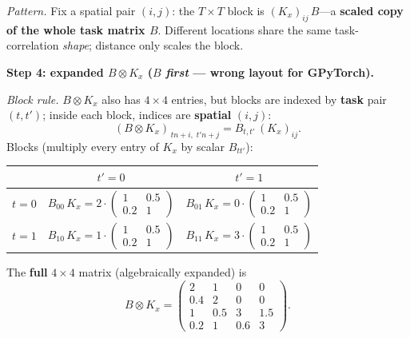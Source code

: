 \documentclass[11pt]{article}
\theoremstyle{plain}
\begin{document}
\smallskip\noindent
\textit{Pattern.} Fix a spatial pair $(i,j)$: the $T \times T$ block is $(K_x)_{ij}\,B$---a \textbf{scaled copy of the whole task matrix $B$}.
Different locations share the same task-correlation \emph{shape}; distance only scales the block.

\medskip
\textbf{Step 4: expanded $B \otimes K_x$ ($B$ \emph{first} --- wrong layout for GPyTorch).}

\smallskip\noindent
\textit{Block rule.} $B \otimes K_x$ also has $4 \times 4$ entries, but blocks are indexed by
\textbf{task} pair $(t,t')$; inside each block, indices are \textbf{spatial} $(i,j)$:
\begin{equation*}
  (B \otimes K_x)_{\,t n + i,\; t' n + j}
  = B_{t,t'}\, (K_x)_{ij}.
\end{equation*}
Blocks (multiply every entry of $K_x$ by scalar $B_{tt'}$):
\begin{center}
\renewcommand{\arraystretch}{1.2}
\begin{tabular}{@{}c|c|c@{}}
  & $t'=0$ & $t'=1$ \\
\midrule
$t=0$
& $B_{00}\,K_x = 2 \cdot \begin{pmatrix}1&0.5\\0.2&1\end{pmatrix}$
& $B_{01}\,K_x = 0 \cdot \begin{pmatrix}1&0.5\\0.2&1\end{pmatrix}$ \\[8pt]
$t=1$
& $B_{10}\,K_x = 1 \cdot \begin{pmatrix}1&0.5\\0.2&1\end{pmatrix}$
& $B_{11}\,K_x = 3 \cdot \begin{pmatrix}1&0.5\\0.2&1\end{pmatrix}$ \\
\end{tabular}
\end{center}
The \textbf{full} $4 \times 4$ matrix (algebraically expanded) is
\begin{equation*}
  B \otimes K_x
  = \begin{pmatrix}
      2   & 1   & 0   & 0 \\
      0.4 & 2   & 0   & 0 \\
      1   & 0.5 & 3   & 1.5 \\
      0.2 & 1   & 0.6 & 3
    \end{pmatrix}.
\end{equation*}
\end{document}
